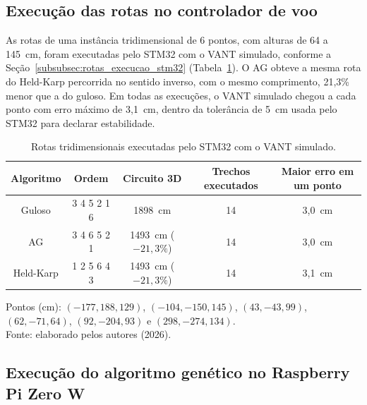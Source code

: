 \subsection{Execução das rotas no controlador de voo}\label{subsec:res_rotas_stm32}

As rotas de uma instância tridimensional de 6 pontos, com alturas de 64 a 145~cm, foram executadas pelo STM32 com o VANT simulado, conforme a Seção~\ref{subsubsec:rotas_execucao_stm32} (Tabela~\ref{tab:rotas_stm32}). O AG obteve a mesma rota do Held-Karp percorrida no sentido inverso, com o mesmo comprimento, 21,3\% menor que a do guloso. Em todas as execuções, o VANT simulado chegou a cada ponto com erro máximo de 3,1~cm, dentro da tolerância de 5~cm usada pelo STM32 para declarar estabilidade.

\begin{table}[H]
    \centering
    \caption{Rotas tridimensionais executadas pelo STM32 com o VANT simulado.}
    \label{tab:rotas_stm32}
    \small
    \renewcommand{\arraystretch}{1.2}
    \begin{tabular}{ccccc}
        \hline
        \textbf{Algoritmo} & \textbf{Ordem} & \textbf{Circuito 3D} & \textbf{Trechos executados} & \textbf{Maior erro em um ponto} \\
        \hline
        Guloso & 3 4 5 2 1 6 & 1898~cm & 14 & 3,0~cm \\
        AG & 3 4 6 5 2 1 & 1493~cm ($-21{,}3\%$) & 14 & 3,0~cm \\
        Held-Karp & 1 2 5 6 4 3 & 1493~cm ($-21{,}3\%$) & 14 & 3,1~cm \\
        \hline
    \end{tabular}
    \par\vspace{0.15cm}
    \footnotesize Pontos (cm): $(-177, 188, 129)$, $(-104, -150, 145)$, $(43, -43, 99)$, $(62, -71, 64)$, $(92, -204, 93)$ e $(298, -274, 134)$.\\
    Fonte: elaborado pelos autores (2026).
\end{table}

\subsection{Execução do algoritmo genético no Raspberry Pi Zero W}\label{subsec:res_rotas_pi}

